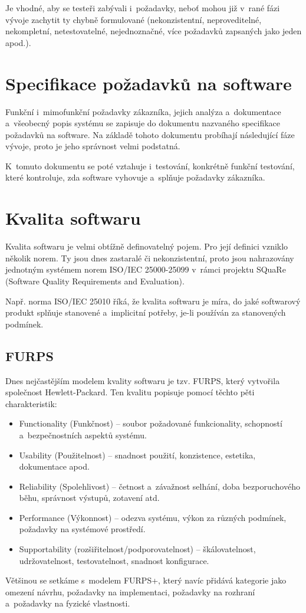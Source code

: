 	Je vhodné, aby se testeři zabývali i~požadavky, neboť mohou již v~rané fázi vývoje zachytit ty chybně formulované (nekonzistentní, neproveditelné, nekompletní, netestovatelné, nejednoznačné, více požadavků zapsaných jako jeden apod.).
	
	\section{Specifikace požadavků na software}
	Funkční i~mimofunkční požadavky zákazníka, jejich analýza a~dokumentace a~všeobecný popis systému se zapisuje do dokumentu nazvaného specifikace požadavků na software. Na základě tohoto dokumentu probíhají následující fáze vývoje, proto je jeho správnost velmi podstatná.
	
	K~tomuto dokumentu se poté vztahuje i~testování, konkrétně funkční testování, které kontroluje, zda software vyhovuje a~splňuje požadavky zákazníka.
	
	\section{Kvalita softwaru}
	Kvalita softwaru je velmi obtížně definovatelný pojem. Pro její definici vzniklo několik norem. Ty jsou dnes zastaralé či nekonzistentní, proto jsou nahrazovány jednotným systémem norem ISO/IEC 25000-25099 v~rámci projektu SQuaRe (Software Quality Requirements and Evaluation).
	
	Např. norma ISO/IEC 25010 říká, že kvalita softwaru je míra, do jaké softwarový produkt splňuje stanovené a~implicitní potřeby, je-li používán za stanovených podmínek.
	
		\subsection{FURPS}
		Dnes nejčastějším modelem kvality softwaru je tzv. FURPS, který vytvořila společnost Hewlett-Packard. Ten kvalitu popisuje pomocí těchto pěti charakteristik:
			\begin{itemize}
				\item Functionality (Funkčnost) -- soubor požadované funkcionality, schopností a~bezpečnostních aspektů systému.
				\item Usability (Použitelnost) -- snadnost použití, konzistence, estetika, dokumentace apod.
				\item Reliability (Spolehlivost) -- četnost a~závažnost selhání, doba bezporuchového běhu, správnost výstupů, zotavení atd.
				\item Performance (Výkonnost) -- odezva systému, výkon za různých podmínek, požadavky na systémové prostředí.
				\item Supportability (rozšiřitelnost/podporovatelnost) -- škálovatelnost, udržovatelnost, testovatelnost, snadnost konfigurace.
			\end{itemize}
		Většinou se setkáme s~modelem FURPS+, který navíc přidává kategorie jako omezení návrhu, požadavky na implementaci, požadavky na rozhraní a~požadavky na fyzické vlastnosti.
			
